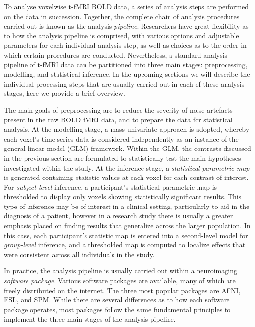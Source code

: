 To analyse voxelwise t-fMRI BOLD data, a series of analysis steps are performed on the data in succession. Together, the complete chain of analysis procedures carried out is known as the analysis \textit{pipeline}. Researchers have great flexibility as to how the analysis pipeline is comprised, with various options and adjustable parameters for each individual analysis step, as well as choices as to the order in which certain procedures are conducted. Nevertheless, a standard analysis pipeline of t-fMRI data can be partitioned into three main stages: preprocessing, modelling, and statistical inference. In the upcoming sections we will describe the individual processing steps that are usually carried out in each of these analysis stages, here we provide a brief overview.

The main goals of preprocessing are to reduce the severity of noise artefacts present in the raw BOLD fMRI data, and to prepare the data for statistical analysis. At the modelling stage, a mass-univariate approach is adopted, whereby each voxel's time-series data is considered independently as an instance of the general linear model (GLM) framework. Within the GLM, the contrasts discussed in the previous section are formulated to statistically test the main hypotheses investigated within the study. At the inference stage, a \textit{statistical parametric map} is generated containing statistic values at each voxel for each contrast of interest. For \textit{subject-level} inference, a participant's statistical parametric map is thresholded to display only voxels showing statistically significant results. This type of inference may be of interest in a clinical setting, particularly to aid in the diagnosis of a patient, however in a research study there is usually a greater emphasis placed on finding results that generalize across the larger population. In this case, each participant's statistic map is entered into a second-level model for \textit{group-level} inference, and a thresholded map is computed to localize effects that were consistent across all individuals in the study. 


In practice, the analysis pipeline is usually carried out within a neuroimaging \textit{software package}. Various software packages are available, many of which are freely distributed on the internet. The three most popular packages are AFNI, FSL, and SPM. While there are several differences as to how each software package operates, most packages follow the same fundamental principles to implement the three main stages of the analysis pipeline.     


